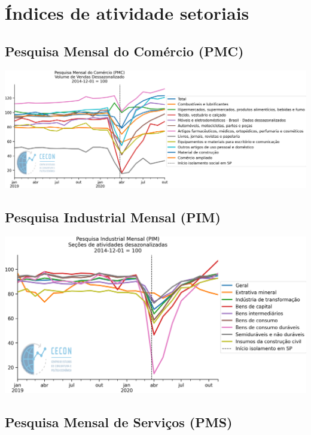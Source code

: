 \documentclass{SelfArx}
\begin{document}
\section*{Índices de atividade setoriais}
\label{sec:orgd281b13}


\subsection*{Pesquisa Mensal do Comércio (PMC)}
\label{sec:org602df64}

\begin{center}
\includegraphics[width=.9\linewidth]{./figs/Setoriais/PMC_IBGE.png}
\end{center}


\subsection*{Pesquisa Industrial Mensal (PIM)}
\label{sec:orge35af9d}

\begin{center}
\includegraphics[width=.9\linewidth]{./figs/Setoriais/PIM_IBGE.png}
\end{center}


\subsection*{Pesquisa Mensal de Serviços (PMS)}
\label{sec:org7973cd6}
\end{document}
